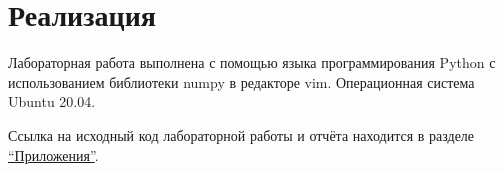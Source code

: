 \section{Реализация}

Лабораторная работа выполнена с помощью языка программирования Python с использованием библиотеки numpy в редакторе vim. Операционная система Ubuntu 20.04.

Ссылка на исходный код лабораторной работы и отчёта находится в разделе \hyperref[app]{``Приложения''}.